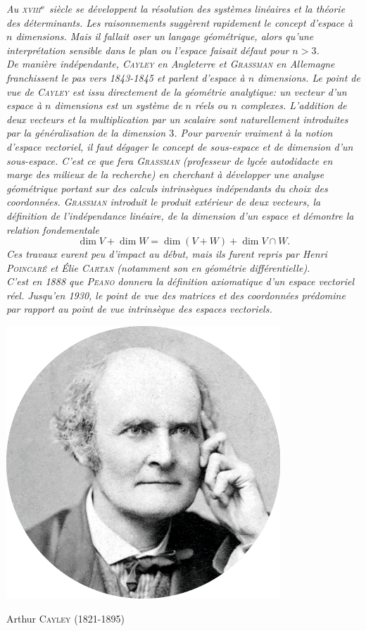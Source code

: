 \textsl{Au \textsc{xviii}$^{\mathrm{e}}$ siècle se développent la résolution des systèmes linéaires et la théorie des déterminants. Les raisonnements suggèrent rapidement le concept d'espace à $n$ dimensions. Mais il fallait oser un langage géométrique, alors qu'une interprétation sensible dans le plan ou l'espace faisait défaut pour $n > 3$. \\
De manière indépendante, \textsc{Cayley} en Angleterre et \textsc{Grassman} en Allemagne franchissent le pas vers 1843-1845 et parlent d'espace à $n$ dimensions. Le point de vue de \textsc{Cayley} est issu directement de la géométrie analytique: un vecteur d'un espace à $n$ dimensions est un système de $n$ réels ou $n$ complexes. L'addition de deux vecteurs et la multiplication par un scalaire sont naturellement introduites par la généralisation de la dimension $3$. Pour parvenir vraiment à la notion d'espace vectoriel, il faut dégager le concept de sous-espace et de dimension d'un sous-espace. C'est ce que fera \textsc{Grassman} (professeur de lycée autodidacte en marge des milieux de la recherche) en cherchant à développer une analyse géométrique portant sur des calculs intrinsèques indépendants du choix des coordonnées. \textsc{Grassman} introduit le produit extérieur de deux vecteurs, la définition de l'indépendance linéaire, de la dimension d'un espace et démontre la relation fondementale
$$\dim V + \dim W = \dim (V + W) + \dim V \cap W.$$
Ces travaux eurent peu d'impact au début, mais ils furent repris par Henri \textsc{Poincaré} et Élie \textsc{Cartan} (notamment son  en géométrie différentielle). \\
C'est en 1888 que \textsc{Peano} donnera la définition axiomatique d'un espace vectoriel réel. Jusqu'en 1930, le point de vue des matrices et des coordonnées prédomine par rapport au point de vue intrinsèque des espaces vectoriels.
}

\begin{marginfigure}[-13cm]
    \centering
    \includegraphics{images/arthur_cayley.png}
    \caption*{\centering Arthur \textsc{Cayley} (1821-1895)}
\end{marginfigure}

